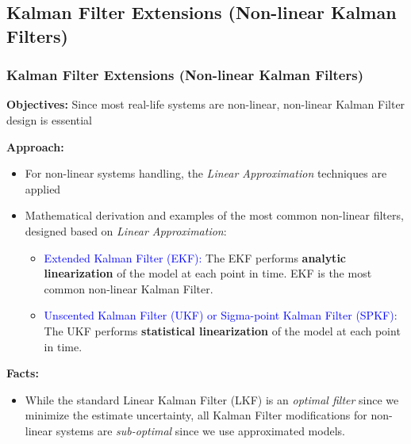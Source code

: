 \subsection{Kalman Filter Extensions (Non-linear Kalman Filters)}


\begin{frame}
   \frametitle{Kalman Filter Extensions (Non-linear Kalman Filters)}
		
		\textbf{Objectives:} Since most real-life systems are non-linear, non-linear Kalman Filter design is essential 

            \textbf{Approach:}
		\begin{itemize}
            \item For non-linear systems handling, the \textit{Linear Approximation} techniques are applied
			\item Mathematical derivation and examples of the most common non-linear filters, designed based on \textit{Linear Approximation}:
            \begin{itemize}
                \item \textcolor{blue}{Extended Kalman Filter (EKF):} The EKF performs \textbf{analytic linearization} of the model at each point in time. EKF is the most common non-linear Kalman Filter.
                \item \textcolor{blue}{Unscented Kalman Filter (UKF) or Sigma-point Kalman Filter (SPKF):} The UKF performs \textbf{statistical linearization} of the model at each point in time.
            \end{itemize}
		\end{itemize}
  \textbf{Facts:} 
  \begin{itemize}
      \item While the standard Linear Kalman Filter (LKF) is an \textit{optimal filter} since we minimize the estimate uncertainty, all Kalman Filter modifications for non-linear systems are \textit{sub-optimal} since we use approximated models.
  \end{itemize}
\end{frame}




